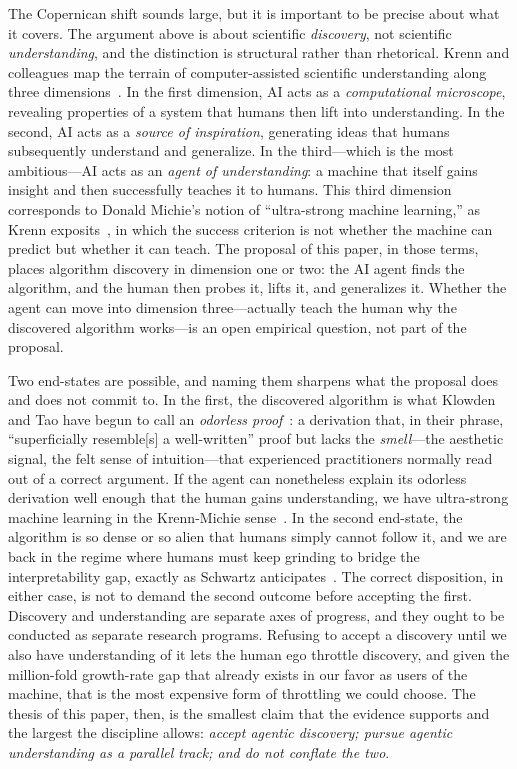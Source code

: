 \documentclass[11pt]{article}
\begin{document}
The Copernican shift sounds large, but it is important to be precise about what it covers. The argument above is about scientific \emph{discovery}, not scientific \emph{understanding}, and the distinction is structural rather than rhetorical. Krenn and colleagues map the terrain of computer-assisted scientific understanding along three dimensions~\cite{krenn2022understanding}. In the first dimension, AI acts as a \emph{computational microscope}, revealing properties of a system that humans then lift into understanding. In the second, AI acts as a \emph{source of inspiration}, generating ideas that humans subsequently understand and generalize. In the third---which is the most ambitious---AI acts as an \emph{agent of understanding}: a machine that itself gains insight and then successfully teaches it to humans. This third dimension corresponds to Donald Michie's notion of ``ultra-strong machine learning,'' as Krenn exposits~\cite{krenn2022understanding}, in which the success criterion is not whether the machine can predict but whether it can teach. The proposal of this paper, in those terms, places algorithm discovery in dimension one or two: the AI agent finds the algorithm, and the human then probes it, lifts it, and generalizes it. Whether the agent can move into dimension three---actually teach the human why the discovered algorithm works---is an open empirical question, not part of the proposal.

Two end-states are possible, and naming them sharpens what the proposal does and does not commit to. In the first, the discovered algorithm is what Klowden and Tao have begun to call an \emph{odorless proof}~\cite{klowden2026math}: a derivation that, in their phrase, ``superficially resemble[s] a well-written'' proof but lacks the \emph{smell}---the aesthetic signal, the felt sense of intuition---that experienced practitioners normally read out of a correct argument. If the agent can nonetheless explain its odorless derivation well enough that the human gains understanding, we have ultra-strong machine learning in the Krenn-Michie sense~\cite{krenn2022understanding}. In the second end-state, the algorithm is so dense or so alien that humans simply cannot follow it, and we are back in the regime where humans must keep grinding to bridge the interpretability gap, exactly as Schwartz anticipates~\cite{schwartz2022interpretable}. The correct disposition, in either case, is not to demand the second outcome before accepting the first. Discovery and understanding are separate axes of progress, and they ought to be conducted as separate research programs. Refusing to accept a discovery until we also have understanding of it lets the human ego throttle discovery, and given the million-fold growth-rate gap that already exists in our favor as users of the machine, that is the most expensive form of throttling we could choose. The thesis of this paper, then, is the smallest claim that the evidence supports and the largest the discipline allows: \emph{accept agentic discovery; pursue agentic understanding as a parallel track; and do not conflate the two}.
\end{document}
